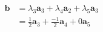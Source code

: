 \documentclass[preview]{standalone}
\renewcommand{\vec}{\mathbf}
\begin{document}
\begin{center}
\begin{align*}\vec{b}&=\lambda_3\vec{a}_3+\lambda_4\vec{a}_2+\lambda_5\vec{a}_3\\&=\frac{1}{2}\vec{a}_3+\frac{-1}{2}\vec{a}_4+0\vec{a}_5\end{align*}
\end{center}
\end{document}
